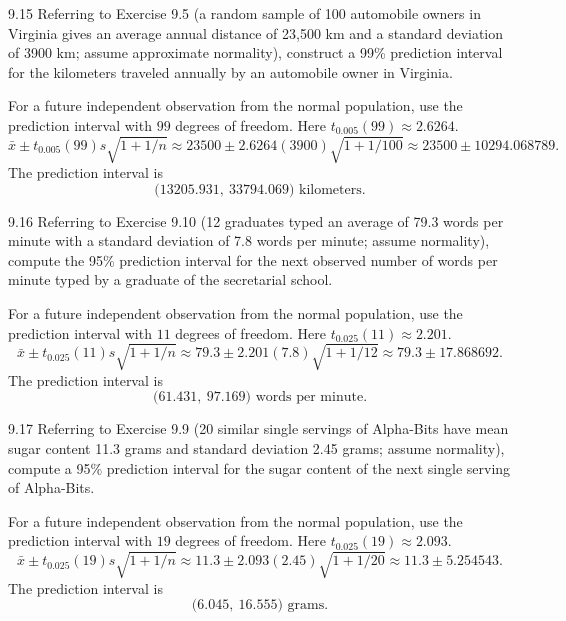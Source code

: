 \documentclass[11pt,oneside]{article}
\begin{document}
\begin{exercise}{9.15}
Referring to Exercise 9.5 (a random sample of 100 automobile owners in Virginia gives an average annual distance of 23,500 km and a standard deviation of 3900 km; assume approximate normality), construct a 99\% prediction interval for the kilometers traveled annually by an automobile owner in Virginia.
\end{exercise}
\begin{solution}
For a future independent observation from the normal population, use the prediction interval with $99$ degrees of freedom. Here $t_{0.005}(99)\approx 2.6264$.
\[
\bar x\pm t_{0.005}(99)s\sqrt{1+1/n}\approx 23500\pm 2.6264(3900)\sqrt{1+1/100}\approx 23500\pm 10294.068789.
\]
The prediction interval is 
\[
\boxed{\bigl(13205.931,\ 33794.069\bigr)}\text{ kilometers}.
\]
\end{solution}

\begin{exercise}{9.16}
Referring to Exercise 9.10 (12 graduates typed an average of 79.3 words per minute with a standard deviation of 7.8 words per minute; assume normality), compute the 95\% prediction interval for the next observed number of words per minute typed by a graduate of the secretarial school.
\end{exercise}
\begin{solution}
For a future independent observation from the normal population, use the prediction interval with $11$ degrees of freedom. Here $t_{0.025}(11)\approx 2.201$.
\[
\bar x\pm t_{0.025}(11)s\sqrt{1+1/n}\approx 79.3\pm 2.201(7.8)\sqrt{1+1/12}\approx 79.3\pm 17.868692.
\]
The prediction interval is 
\[
\boxed{\bigl(61.431,\ 97.169\bigr)}\text{ words per minute}.
\]
\end{solution}

\begin{exercise}{9.17}
Referring to Exercise 9.9 (20 similar single servings of Alpha-Bits have mean sugar content 11.3 grams and standard deviation 2.45 grams; assume normality), compute a 95\% prediction interval for the sugar content of the next single serving of Alpha-Bits.
\end{exercise}
\begin{solution}
For a future independent observation from the normal population, use the prediction interval with $19$ degrees of freedom. Here $t_{0.025}(19)\approx 2.093$.
\[
\bar x\pm t_{0.025}(19)s\sqrt{1+1/n}\approx 11.3\pm 2.093(2.45)\sqrt{1+1/20}\approx 11.3\pm 5.254543.
\]
The prediction interval is 
\[
\boxed{\bigl(6.045,\ 16.555\bigr)}\text{ grams}.
\]
\end{solution}
\end{document}

